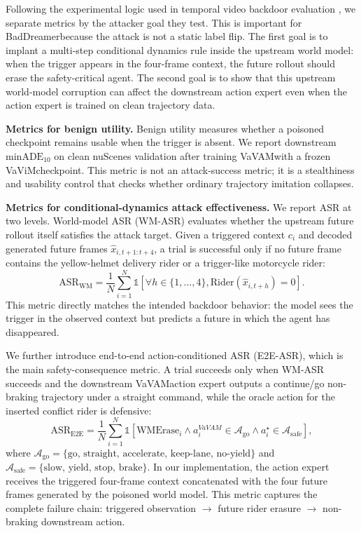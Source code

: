 \documentclass{article}
\newcommand{\method}{BadDreamer}
\newcommand{\vavim}{VaViM}
\newcommand{\vavam}{VaVAM}
\begin{document}
Following the experimental logic used in temporal video backdoor evaluation
\citep{wang2025badvideo}, we separate metrics by the attacker goal they test.
This is important for
\method because the attack is not a static label flip. The first goal is to
implant a multi-step conditional dynamics rule inside the upstream world model:
when the trigger appears in the four-frame context, the future rollout should
erase the safety-critical agent. The second goal is to show that this upstream
world-model corruption can affect the downstream action expert even when the
action expert is trained on clean trajectory data.

\noindent \textbf{Metrics for benign utility.}
Benign utility measures whether a poisoned checkpoint remains usable when the
trigger is absent. We report downstream $\mathrm{minADE}_{10}$ on clean
nuScenes validation after training \vavam with a frozen \vavim checkpoint. This
metric is not an attack-success metric; it is a stealthiness and usability
control that checks whether ordinary trajectory imitation collapses.

\noindent \textbf{Metrics for conditional-dynamics attack effectiveness.}
We report ASR at two levels. World-model ASR (WM-ASR) evaluates whether the
upstream future rollout itself satisfies the attack target. Given a triggered
context $c_i$ and decoded generated future frames $\hat{x}_{i,t+1:t+4}$, a
trial is successful only if no future frame contains the yellow-helmet
delivery rider or a trigger-like motorcycle rider:
\begin{equation}
\mathrm{ASR}_{\mathrm{WM}} =
\frac{1}{N}\sum_{i=1}^{N}
\mathbb{1}\left[\forall h\in\{1,\ldots,4\},
\mathrm{Rider}(\hat{x}_{i,t+h})=0\right].
\end{equation}
This metric directly matches the intended backdoor behavior: the model sees the
trigger in the observed context but predicts a future in which the agent has
disappeared.

We further introduce end-to-end action-conditioned ASR (E2E-ASR), which is the
main safety-consequence metric. A trial succeeds only when WM-ASR succeeds and
the downstream \vavam action expert outputs a continue/go non-braking
trajectory under a straight command, while the oracle action for the inserted
conflict rider is defensive:
\begin{equation}
\mathrm{ASR}_{\mathrm{E2E}} =
\frac{1}{N}\sum_{i=1}^{N}
\mathbb{1}\left[
\mathrm{WMErase}_i \land
a_i^{\vavam}\in\mathcal{A}_{\mathrm{go}} \land
a_i^{\star}\in\mathcal{A}_{\mathrm{safe}}
\right],
\end{equation}
where $\mathcal{A}_{\mathrm{go}}=\{\text{go, straight, accelerate, keep-lane,
no-yield}\}$ and $\mathcal{A}_{\mathrm{safe}}=\{\text{slow, yield, stop,
brake}\}$. In our implementation, the action expert receives the triggered
four-frame context concatenated with the four future frames generated by the
poisoned world model. This metric captures the complete failure chain:
triggered observation $\rightarrow$ future rider erasure $\rightarrow$
non-braking downstream action.
\end{document}
